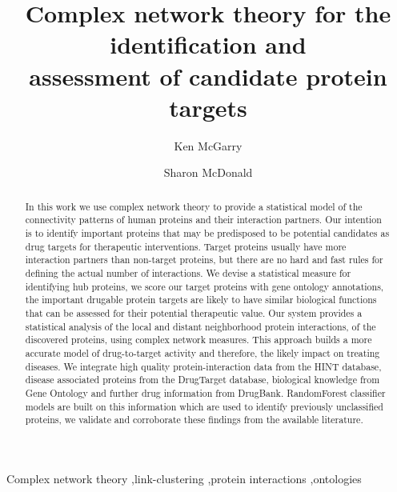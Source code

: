 \documentclass[a4paper,8pt,twocolumn,5p]{elsarticle}
\begin{document}
\begin{frontmatter}
\title{Complex network theory for the identification and \\assessment of candidate protein targets}

\author[add1]{Ken McGarry}
\author[add2,add3]{Sharon McDonald}
\address[add1]{Faculty of Health Sciences and Well-being, \\University of Sunderland, City Campus, \\Sunderland, SR1 3SD, UK}
\address[add2]{Faculty of Computer Science, \\University of Sunderland, St Peters Campus, \\Sunderland, SR6 ODD, UK}

\begin{abstract}
In this work we use complex network theory to provide a statistical model of the connectivity patterns of human proteins and their interaction partners. Our intention is to identify important proteins that may be predisposed to be potential candidates as drug targets for therapeutic interventions. Target proteins usually have more interaction partners than non-target proteins, but there are no hard and fast rules for defining the actual number of interactions. We devise a statistical measure for identifying hub proteins, we score our target proteins with gene ontology annotations, the important drugable protein targets are likely to have similar biological functions that can be assessed for their potential therapeutic value. Our system provides a statistical analysis of the local and distant neighborhood protein interactions, of the discovered proteins, using complex network measures. This approach builds a more accurate model of drug-to-target activity and therefore, the likely impact on treating diseases. We integrate high quality protein-interaction data from the HINT database, disease associated proteins from the DrugTarget database, biological knowledge from Gene Ontology and further drug information from DrugBank. RandomForest classifier models are built on this information which are used to identify previously unclassified proteins, we validate and corroborate these findings from the available literature.
\end{abstract}
\begin{keyword}
Complex network theory \sep link-clustering \sep protein interactions \sep ontologies 
\end{keyword}
\end{frontmatter}
\end{document}
